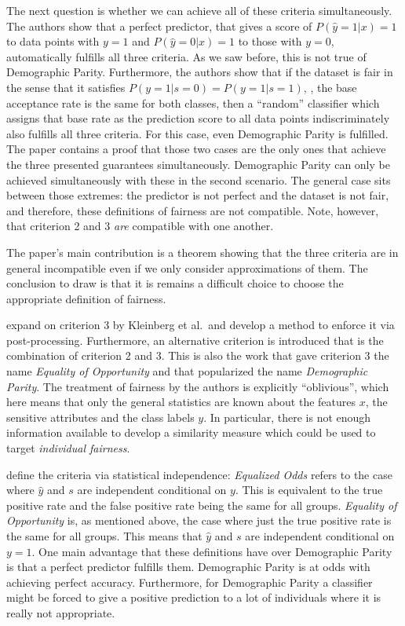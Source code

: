 The next question is whether we can achieve all of these criteria simultaneously. The
authors show that a perfect predictor, that gives a score of \(P(\hat{y}=1|x) = 1\) to data
points with \(y=1\) and \(P(\hat{y}=0|x) = 1\) to those with \(y=0\), automatically fulfills all
three criteria. As we saw before, this is not true of Demographic Parity. Furthermore, the
authors show that if the dataset is fair in the sense that it satisfies \(P(y=1|s=0) = 
P(y=1|s=1)\), \ie, the base acceptance rate is the same for both classes, then a ``random''
classifier which assigns that base rate as the prediction score to all data points
indiscriminately also fulfills all three criteria. For this case, even Demographic Parity
is fulfilled. The paper contains a proof that those two cases are the only ones that
achieve the three presented guarantees simultaneously. Demographic Parity can only be
achieved simultaneously with these in the second scenario. The general case sits between
those extremes: the predictor is not perfect and the dataset is not fair, and therefore,
these definitions of fairness are not compatible. Note, however, that criterion 2 and 3
\emph{are} compatible with one another.

The paper's main contribution is a theorem showing that the three criteria are in general
incompatible even if we only consider approximations of them. The conclusion to draw is
that it is remains a difficult choice to choose the appropriate definition of fairness.

\citet{hardt2016equality} expand on criterion 3 by Kleinberg et al.~and develop a
method to enforce it via post-processing. Furthermore, an alternative criterion is
introduced that is the combination of criterion 2 and 3. This is also the work that gave
criterion 3 the name \emph{Equality of Opportunity} and that popularized the name \emph{Demographic
Parity}. The treatment of fairness by the authors is explicitly ``oblivious'', which here
means that only the general statistics are known about the features \(x\), the sensitive
attributes and the class labels \(y\). In particular, there is not enough information
available to develop a similarity measure which could be used to target \emph{individual
fairness}.

\citet{hardt2016equality} define the criteria via statistical independence: \emph{Equalized Odds} refers to
the case where \(\hat{y}\) and \(s\) are independent conditional on \(y\). This is equivalent to
the true positive rate and the false positive rate being the same for all groups.
\emph{Equality of Opportunity} is, as mentioned above, the case where just the true positive
rate is the same for all groups. This means that \(\hat{y}\) and \(s\) are independent
conditional on \(y=1\). One main advantage that these definitions have over Demographic
Parity is that a perfect predictor fulfills them. Demographic Parity is at odds with
achieving perfect accuracy. Furthermore, for Demographic Parity a classifier might be
forced to give a positive prediction to a lot of individuals where it is really not
appropriate.

